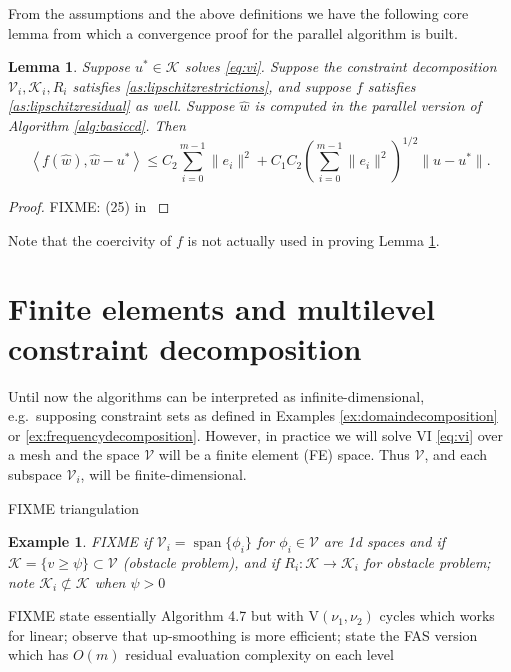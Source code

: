 \documentclass[letterpaper,final,12pt,reqno]{amsart}
\theoremstyle{cstyle}
\newtheorem{lemma}[theorem]{Lemma}
\theoremstyle{cstyle*}
\theoremstyle{dstyle}
\newtheorem{example}[theorem]{Example}
\numberwithin{equation}{section}
\numberwithin{figure}{section}
\numberwithin{table}{section}
\numberwithin{theorem}{section}
\newcommand{\cK}{\mathcal{K}}
\newcommand{\cV}{\mathcal{V}}
\newcommand{\ip}[2]{\left<#1,#2\right>}
\newcommand{\Span}{\operatorname{span}}
\begin{document}
From the assumptions and the above definitions we have the following core lemma from which a convergence proof for the parallel algorithm is built.

\begin{lemma} \label{lem:core}  Suppose $u^* \in \mathcal{K}$ solves \eqref{eq:vi}.  Suppose the constraint decomposition $\mathcal{V}_i,\mathcal{K}_i,R_i$ satisfies \eqref{as:lipschitzrestrictions}, and suppose $f$ satisfies \eqref{as:lipschitzresidual} as well.  Suppose $\hat w$ is computed in the parallel version of Algorithm \ref{alg:basiccd}.  Then
\begin{equation}
   \ip{f(\hat w)}{\hat w - u^*} \le C_2 \sum_{i=0}^{m-1} \|e_i\|^2 + C_1 C_2 \left(\sum_{i=0}^{m-1} \|e_i\|^2\right)^{1/2} \|u-u^*\|. \label{eq:core}
\end{equation}
\end{lemma}

\begin{proof}
FIXME: (25) in \cite{Tai2003}
\end{proof}

Note that the coercivity of $f$ is not actually used in proving Lemma \ref{lem:core}.


\section{Finite elements and multilevel constraint decomposition} \label{sec:multilevel}

Until now the algorithms can be interpreted as infinite-dimensional, e.g.~supposing constraint sets as defined in Examples \ref{ex:domaindecomposition} or \ref{ex:frequencydecomposition}.  However, in practice we will solve VI \eqref{eq:vi} over a mesh and the space $\cV$ will be a finite element (FE) space.  Thus $\cV$, and each subspace $\cV_i$, will be finite-dimensional.

FIXME triangulation

\begin{example}  FIXME if $\cV_i=\Span\{\phi_i\}$ for $\phi_i\in\cV$ are 1d spaces and if $\cK = \{v \ge \psi\} \subset \cV$ (obstacle problem), and if $R_i : \cK \to \cK_i$ for obstacle problem; note $\cK_i \not\subset \cK$ when $\psi>0$
\end{example}

FIXME state essentially Algorithm 4.7 \cite{GraeserKornhuber2009} but with $\text{V}(\nu_1,\nu_2)$ cycles which works for linear; observe that up-smoothing is more efficient; state the FAS version which has $O(m)$ residual evaluation complexity on each level
\end{document}
